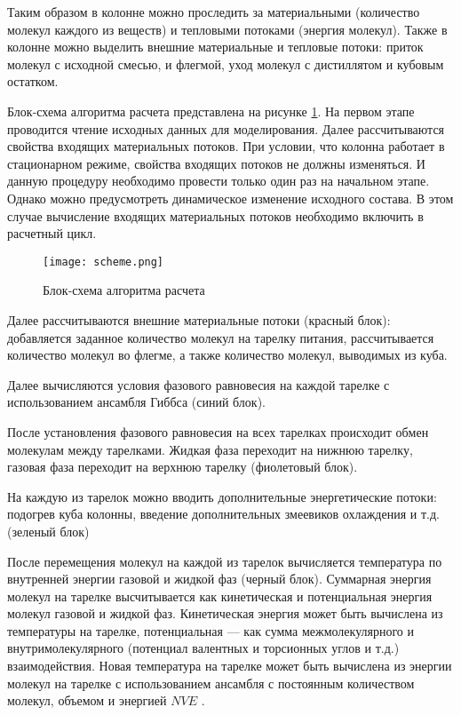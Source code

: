 Таким образом в колонне можно проследить за материальными (количество молекул каждого из веществ) и тепловыми потоками (энергия молекул). Также в колонне можно выделить внешние материальные и тепловые потоки: приток молекул с исходной смесью, и флегмой, уход молекул с дистиллятом и кубовым остатком.

Блок-схема алгоритма расчета представлена на рисунке \ref{fig:alg_scheme}. На первом этапе проводится чтение исходных данных для моделирования. Далее рассчитываются свойства входящих материальных потоков. При условии, что колонна работает в стационарном режиме, свойства входящих потоков не должны изменяться. И данную процедуру необходимо провести только один раз на начальном этапе. Однако можно предусмотреть динамическое изменение исходного состава. В этом случае вычисление входящих материальных потоков необходимо включить в расчетный цикл.

\begin{figure}
	\begin{center}
		\texttt{[image: scheme.png]}
	\end{center}
	\caption{Блок-схема алгоритма расчета} \label{fig:alg_scheme}
\end{figure}

Далее рассчитываются внешние материальные потоки (красный блок): добавляется заданное количество молекул на тарелку питания, рассчитывается количество молекул во флегме, а также количество молекул, выводимых из куба.

Далее вычисляются условия фазового равновесия на каждой тарелке с использованием ансамбля Гиббса (синий блок).

После установления фазового равновесия на всех тарелках происходит обмен молекулам между тарелками. Жидкая фаза переходит на нижнюю тарелку, газовая фаза переходит на верхнюю тарелку (фиолетовый блок).

На каждую из тарелок можно вводить дополнительные энергетические потоки: подогрев куба колонны, введение дополнительных змеевиков охлаждения и т.д. (зеленый блок)

После перемещения молекул на каждой из тарелок вычисляется температура по внутренней энергии газовой и жидкой фаз (черный блок). Суммарная энергия молекул на тарелке высчитывается как кинетическая и потенциальная энергия молекул газовой и жидкой фаз. Кинетическая энергия может быть вычислена из температуры на тарелке, потенциальная --- как сумма межмолекулярного и внутримолекулярного (потенциал валентных и торсионных углов и т.д.) взаимодействия.
Новая температура на тарелке может быть вычислена из энергии молекул на тарелке с использованием ансамбля с постоянным количеством молекул, объемом и энергией $NVE$ \cite{Lustig1998}.

